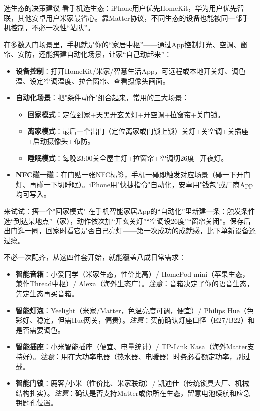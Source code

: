 \begin{tcbinfo}{选生态的决策建议}
看手机选生态：iPhone用户优先HomeKit，华为用户优先智联，其他安卓用户米家最省心。靠Matter协议，不同生态的设备也能被同一部手机控制，不必一次性“站队”。

\end{tcbinfo}


在多数入门场景里，手机就是你的“家居中枢”——通过App控制灯光、空调、窗帘、安防，还能搭建自动化场景，让家“自己动起来”：

\begin{itemize}
  \item \textbf{设备控制}：打开HomeKit/米家/智慧生活App，可远程或本地开关灯、调色温、设定空调温度、拉合窗帘、查看摄像头画面。
  \item \textbf{自动化场景}：把"条件动作"组合起来，常用的三大场景：
  \begin{itemize}
    \item \textbf{回家模式}：定位到家+天黑开玄关灯+开空调+拉窗帘+关门锁。
    \item \textbf{离家模式}：最后一个出门（定位离家或门锁上锁）关灯+关空调+关插座+启动摄像头+布防。
    \item \textbf{睡眠模式}：每晚23:00关全屋主灯+拉窗帘+空调切26度+开夜灯。
  \end{itemize}
  \item \textbf{NFC碰一碰}：在门贴一张NFC标签，手机一碰即触发对应场景（碰一下开门灯、再碰一下切睡眠）。iPhone用"快捷指令"自动化，安卓用"钱包"或厂商App均可写入。
\end{itemize}

\begin{tcbpractice}{来试试：搭一个"回家模式"}
在手机智能家居App的“自动化”里新建一条：触发条件选“到达某地点”（家），动作依次加“开玄关灯”“空调设26度”“窗帘关闭”。保存后出门逛一圈，回家时看它是否自己亮灯——第一次成功的成就感，比下单新设备还过瘾。

\end{tcbpractice}


不必一次配齐，从这四件套开始，就能覆盖八成日常需求：

\begin{itemize}
  \item \textbf{智能音箱}：小爱同学（米家生态，性价比高）/ HomePod mini（苹果生态，兼作Thread中枢）/ Alexa（海外生态广）。\emph{注意}：音箱决定了你的语音生态，先定生态再买音箱。
  \item \textbf{智能灯泡}：Yeelight（米家/Matter，色温亮度可调，便宜）/ Philips Hue（色彩好、稳定，但需Hue网关，偏贵）。\emph{注意}：买前确认灯座口径（E27/B22）和是否需要调色。
  \item \textbf{智能插座}：小米智能插座（便宜、电量统计）/ TP-Link Kasa（海外Matter支持好）。\emph{注意}：用在大功率电器（热水器、电暖器）时务必看额定功率，别过载。
  \item \textbf{智能门锁}：鹿客/小米（性价比、米家联动）/ 凯迪仕（传统锁具大厂、机械结构扎实）。\emph{注意}：确认是否支持Matter或你所在生态，留意电池续航和应急钥匙孔位置。
\end{itemize}

